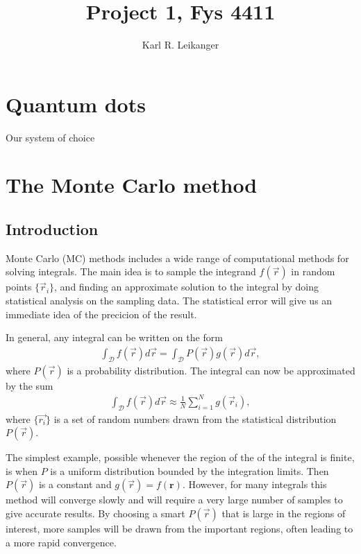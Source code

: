 \documentclass[a4paper,10pt,twocolumn]{article} %
\title{ Project 1, Fys 4411 \\ }
\author{Karl R. Leikanger}
\newcommand{\ts}[1]{\textbf{#1}}
\begin{document}
\maketitle

\begin{abstract}%

\end{abstract}%

\section{Quantum dots}%

Our system of choice 

\section{The Monte Carlo method}%

\subsection{Introduction}%
Monte Carlo (MC) methods includes a wide range of computational methods for solving integrals. 
The main idea is to sample the integrand $f(\vec r)$ in random points $\{\vec r_i\}$, 
and finding an approximate solution to the integral by doing statistical analysis on the sampling data. 
The statistical error will give us an immediate idea of the precicion of the result.

In general, any integral can be written on the form
\begin{align}
\int_{\mathcal D} f(\vec r) d\vec r = 
\int_{\mathcal D} P(\vec r) g(\vec r) d\vec r,
\end{align} 
where $P(\vec r)$ is a probability distribution. The integral can now be approximated by the sum 
\begin{align}
	\int_{\mathcal D} f(\vec r) d\vec r 
\approx \frac1N\sum_{i=1}^Ng(\vec r_i),
\end{align} 
where $\{\vec{r_i}\}$ is a set of random numbers drawn from the statistical distribution $P(\vec r)$.

The simplest example, possible whenever the region of the of the integral is finite,
is when $P$ is a uniform distribution bounded by the integration limits. Then
$P(\vec r)$ is a constant and $g(\vec r)=f(\ts r)$. However, for many integrals this method 
will converge slowly and will require a very large number of samples to
give accurate results. By choosing a smart $P(\vec r)$ that is large in the regions of interest, 
more samples will be drawn from the important regions, often leading to a more rapid convergence.  
\end{document}
